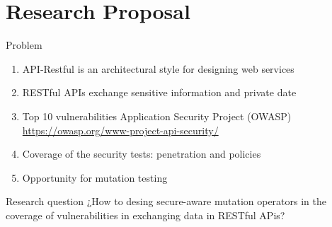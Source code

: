 \documentclass[10pt]{beamer}
\theoremstyle{remark}
\theoremstyle{definition}
\begin{document}
\section{Research Proposal}

\begin{frame}{Problem}

\begin{enumerate}
    \item API-Restful is an architectural style for designing web services
    \item RESTful APIs exchange sensitive information and private date
    \item Top 10 vulnerabilities Application Security Project (OWASP) \url{https://owasp.org/www-project-api-security/}
    \item Coverage of the security tests: penetration and policies
    \item Opportunity for mutation testing
\end{enumerate}
\end{frame}


\begin{frame}{Research question}
¿How to desing secure-aware mutation operators in the coverage of vulnerabilities in exchanging data in RESTful APis?

\end{frame}
\end{document}

